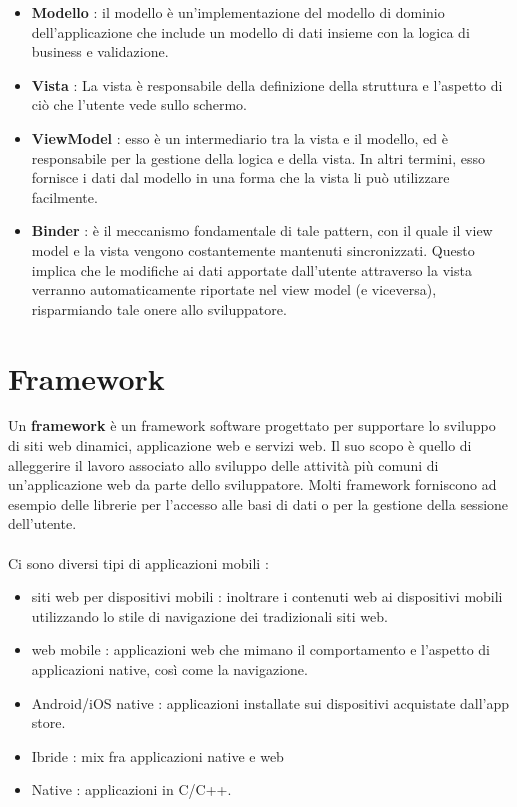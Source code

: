 \documentclass[12pt]{report}
\begin{document}
\begin{itemize}
\begin{itemize}
\item \textbf{Modello} : il modello è un'implementazione del modello di dominio dell'applicazione che include un modello di dati insieme con la logica di business e validazione.
\item \textbf{Vista} : La vista è responsabile della definizione della struttura e l'aspetto di ciò che l'utente vede sullo schermo.
\item \textbf{ViewModel} : esso è un intermediario tra la vista e il modello, ed è responsabile per la gestione della logica e della vista. In altri termini, esso fornisce i dati dal modello in una forma che la vista li può utilizzare facilmente.
\item \textbf{Binder} : è il meccanismo fondamentale di tale pattern, con il quale il view model e la vista vengono costantemente mantenuti sincronizzati. Questo implica che le modifiche ai dati apportate dall'utente attraverso la vista verranno automaticamente riportate nel view model (e viceversa), risparmiando tale onere allo sviluppatore.
\end{itemize}
\end{itemize}
\section{Framework}
Un \textbf{framework} è un framework software progettato per supportare lo sviluppo di siti web dinamici, applicazione web e servizi web. Il suo scopo è quello di alleggerire il lavoro associato allo sviluppo delle attività più comuni di un'applicazione web da parte dello sviluppatore. Molti framework forniscono ad esempio delle librerie per l'accesso alle basi di dati o per la gestione della sessione dell'utente.\\\\Ci sono diversi tipi di applicazioni mobili :
\begin{itemize}
\item siti web per dispositivi mobili : inoltrare i contenuti web ai dispositivi mobili utilizzando lo stile di navigazione dei tradizionali siti web.
\item web mobile : applicazioni web che mimano il comportamento e l'aspetto di applicazioni native, così come la navigazione.
\item Android/iOS native : applicazioni installate sui dispositivi acquistate dall'app store.
\item Ibride : mix fra applicazioni native e web
\item Native : applicazioni in C/C++.
\end{itemize}
\end{document}
